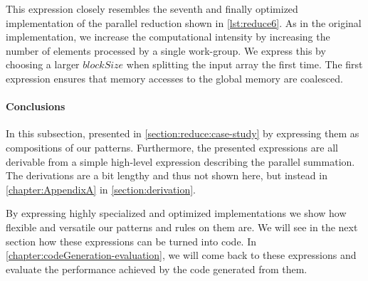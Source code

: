 %
This expression closely resembles the seventh and finally optimized implementation of the parallel reduction shown in \autoref{lst:reduce6}.
As in the original \OpenCL implementation, we increase the computational intensity by increasing the number of elements processed by a single work-group.
We express this by choosing a larger $blockSize$ when splitting the input array the first time.
The first \reorderStride expression ensures that memory accesses to the global memory are coalesced.


\paragraph{Conclusions}
In this subsection,  presented in \autoref{section:reduce:case-study} by expressing them as compositions of our patterns.
Furthermore, the presented expressions are all derivable from a simple high-level expression describing the parallel summation.
The derivations are a bit lengthy and thus not shown here, but instead in \autoref{chapter:AppendixA} in \autoref{section:derivation}.

By expressing highly specialized and optimized implementations we show how flexible and versatile our patterns and rules on them are.
We will see in the next section how these expressions can be turned into \OpenCL code.
In \autoref{chapter:codeGeneration-evaluation}, we will come back to these expressions and evaluate the performance achieved by the \OpenCL code generated from them.




















